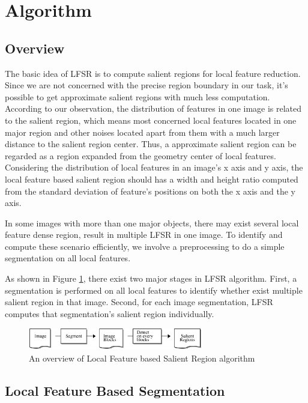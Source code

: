 \section{Algorithm}
\label{sec:algorithm}

\subsection{Overview}
\label{sec:algorithm_overview}

The basic idea of LFSR is to compute salient regions for local feature reduction. Since we are not concerned with the precise region boundary in our task, it's possible to get approximate salient regions with much less computation. According to our observation, the distribution of features in one image is related to the salient region, which means most concerned local features located in one major region and other noises located apart from them with a much larger distance to the salient region center. Thus, a approximate salient region can be regarded as a region expanded from the geometry center of local features. Considering the distribution of local features in an image's x axis and y axis, the local feature based salient region should has a width and height ratio computed from the standard deviation of feature's positions on both the x axis and the y axis.

In some images with more than one major objects, there may exist several local feature dense region, result in multiple LFSR in one image. To identify and compute these scenario efficiently, we involve a preprocessing to do a simple segmentation on all local features. 

As shown in Figure \ref{fig:overview}, there exist two major stages in LFSR algorithm. First, a segmentation is performed on all local features to identify whether exist multiple salient region in that image. Second, for each image segmentation, LFSR computes that segmentation's salient region individually.

\begin{figure}
\centering
\label{fig:overview}
\includegraphics[width=3.0in]{images/fig-overview.eps}
\caption{An overview of Local Feature based Salient Region algorithm}
\end{figure}

\subsection{Local Feature Based Segmentation}
\label{sec:algorithm_segmentation}

